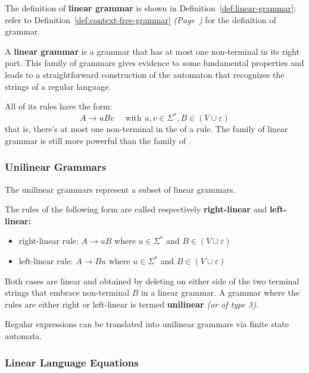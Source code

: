\documentclass[english]{article}
\begin{document}
The definition of \textbf{linear grammar} is shown in Definition~\ref{def:linear-grammar};
refer to Definition~\ref{def:context-free-grammar} \textit{(Page~\pageref{def:context-free-grammar})} for the definition of \CF grammar.

\begin{definition}
  \label{def:linear-grammar}
  A \textbf{linear grammar} is a \CF grammar that has at most one non-terminal in its right part.
  This family of grammars gives evidence to some fundamental properties and leads to a straightforward construction of the automaton that recognizes the strings of a regular language.
\end{definition}

All of its rules have the form:
\[A \rightarrow uBv \quad \text{ with } u, v \in \Sigma^\ast, B \in \left(V \cup \varepsilon\right) \]
that is, there's at most one non-terminal in the \RP of a rule.
The family of linear grammar is still more powerful than the family of \RE.

\subsubsection{Unilinear Grammars}

The unilinear grammars represent a subset of linear grammars.

The rules of the following form are called respectively \textbf{right-linear} and \textbf{left-linear:}

\begin{itemize}
  \item right-linear rule: \(A \rightarrow uB \) where \(u \in \Sigma^\ast\) and \(B \in \left( V \cup \varepsilon \right)\)
  \item left-linear rule: \(A \rightarrow Bu \) where \(u \in \Sigma^\ast\) and \(B \in \left( V \cup \varepsilon \right)\)
\end{itemize}

Both cases are linear and obtained by deleting on either side of the two terminal strings that embrace non-terminal \(B\) in a linear grammar.
A grammar where the rules are either right or left-linear is termed \textbf{unilinear} \textit{(or of type 3)}.

Regular expressions can be translated into unilinear grammars via finite state automata.

\subsubsection{Linear Language Equations}
\end{document}
